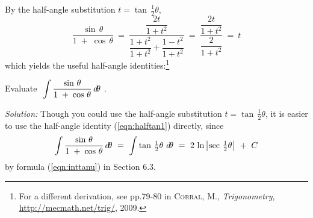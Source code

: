 By the half-angle substitution $t = \tan\,\tfrac{1}{2}\theta$,
\[
\frac{\sin\,\theta}{1 \;+\; \cos\,\theta} ~=~
\frac{\dfrac{2t}{1+t^2}}{\dfrac{1+t^2}{1+t^2} + \dfrac{1-t^2}{1+t^2}} ~=~
\frac{\dfrac{2t}{1+t^2}}{\dfrac{2}{1+t^2}} ~=~ t
\]
which yields the useful half-angle identities:\footnote{For a different
derivation, see pp.79-80 in \textsc{Corral, M.}, \emph{Trigonometry},
\url{http://mecmath.net/trig/}, 2009.}

\begin{exmp}\label{exmp:inthalfangle3}
\noindent Evaluate $~\displaystyle\int \frac{\sin\,\theta}{1 \;+\;
\cos\,\theta}\,d\!\theta~$.\vspace{1mm}
\par\noindent\emph{Solution:} Though you could use the half-angle substitution
$t = \tan\,\tfrac{1}{2}\theta$, it is easier to use the half-angle identity
(\ref{eqn:halftan1}) directly, since
\[
\int \frac{\sin\,\theta}{1 \;+\; \cos\,\theta}\,d\!\theta ~=~
\int \tan\,\tfrac{1}{2}\theta~d\!\theta ~=~
2\,\ln\,\bigl\lvert\mspace{1mu}\sec\,\tfrac{1}{2}\theta\mspace{1mu}\bigr\rvert ~+~ C
\]
by formula (\ref{eqn:inttanu}) in Section 6.3.
\end{exmp}\vspace{-2mm}
\divider
\newpage
\startexercises\label{sec6dot5}
